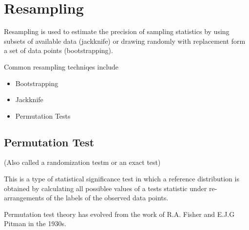 \section{Resampling}

Resampling is used to estimate the precision of sampling statistics by using subsets of available data (jackknife) or drawing randomly with replacement form a set of data points (bootstrapping).

Common resampling techniqes include

\begin{itemize}
\item Bootstrapping
\item Jackknife
\item Permutation Tests
\end{itemize}

\subsection{Permutation Test}

(Also called a randomization testm or an exact test)

This is a type of statistical significance test in which a reference distribution is obtained by 
calculating all possiblee values of a tests statistic under re-arrangements of the labels of the observed data points.

Permutation test theory has evolved from the work of R.A. Fisher and E.J.G Pitman in the 1930s.

